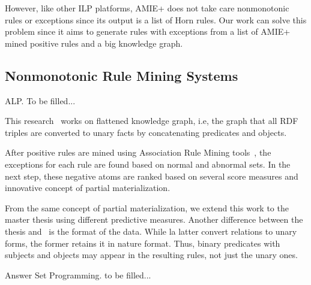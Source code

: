 However, like other ILP platforms, AMIE+ does not take care nonmonotonic rules or exceptions since its output is a list of Horn rules. Our work can solve this problem since it aims to generate rules with exceptions from a list of AMIE+ mined positive rules and a big knowledge graph.

\subsection{Nonmonotonic Rule Mining Systems}
\label{related-work-nonmonotonic-rule-mining-systems}

ALP. To be filled...

This research~\cite{ref12} works on flattened knowledge graph, i.e, the graph that all RDF triples are converted to unary facts by concatenating predicates and objects.

After positive rules are mined using Association Rule Mining tools~\cite{ref13}, the exceptions for each rule are found based on normal and abnormal sets. In the next step, these negative atoms are ranked based on several score measures and innovative concept of partial materialization.

From the same concept of partial materialization, we extend this work to the master thesis using different predictive measures. Another difference between the thesis and~\cite{ref12} is the format of the data. While la latter convert relations to unary forms, the former retains it in nature format. Thus, binary predicates with subjects and objects may appear in the resulting rules, not just the unary ones.

Answer Set Programming. to be filled...
